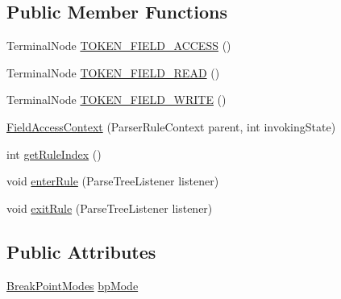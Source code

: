 \subsection*{Public Member Functions}
\begin{DoxyCompactItemize}
\item 
Terminal\+Node \hyperlink{classgov_1_1nasa_1_1jpf_1_1inspector_1_1server_1_1expression_1_1parser_1_1_expression_grammar_parser_1_1_field_access_context_a893899ca8553e97554dba780e0be300a}{T\+O\+K\+E\+N\+\_\+\+F\+I\+E\+L\+D\+\_\+\+A\+C\+C\+E\+SS} ()
\item 
Terminal\+Node \hyperlink{classgov_1_1nasa_1_1jpf_1_1inspector_1_1server_1_1expression_1_1parser_1_1_expression_grammar_parser_1_1_field_access_context_a76f3324c650be5cd44d0a88dac9f4f16}{T\+O\+K\+E\+N\+\_\+\+F\+I\+E\+L\+D\+\_\+\+R\+E\+AD} ()
\item 
Terminal\+Node \hyperlink{classgov_1_1nasa_1_1jpf_1_1inspector_1_1server_1_1expression_1_1parser_1_1_expression_grammar_parser_1_1_field_access_context_ae90dd41f87b8988729f7366e7037cb29}{T\+O\+K\+E\+N\+\_\+\+F\+I\+E\+L\+D\+\_\+\+W\+R\+I\+TE} ()
\item 
\hyperlink{classgov_1_1nasa_1_1jpf_1_1inspector_1_1server_1_1expression_1_1parser_1_1_expression_grammar_parser_1_1_field_access_context_ae83e73c197d5eaecb8ea51b8ab43248d}{Field\+Access\+Context} (Parser\+Rule\+Context parent, int invoking\+State)
\item 
int \hyperlink{classgov_1_1nasa_1_1jpf_1_1inspector_1_1server_1_1expression_1_1parser_1_1_expression_grammar_parser_1_1_field_access_context_ae107e745c9ac943be2c1bfb617a897b5}{get\+Rule\+Index} ()
\item 
void \hyperlink{classgov_1_1nasa_1_1jpf_1_1inspector_1_1server_1_1expression_1_1parser_1_1_expression_grammar_parser_1_1_field_access_context_a9b152ac1e839161b23bd4b2fc586faa5}{enter\+Rule} (Parse\+Tree\+Listener listener)
\item 
void \hyperlink{classgov_1_1nasa_1_1jpf_1_1inspector_1_1server_1_1expression_1_1parser_1_1_expression_grammar_parser_1_1_field_access_context_a1373cdab9ad8d980cfd26f64c76b769f}{exit\+Rule} (Parse\+Tree\+Listener listener)
\end{DoxyCompactItemize}
\subsection*{Public Attributes}
\begin{DoxyCompactItemize}
\item 
\hyperlink{enumgov_1_1nasa_1_1jpf_1_1inspector_1_1server_1_1breakpoints_1_1_break_point_modes}{Break\+Point\+Modes} \hyperlink{classgov_1_1nasa_1_1jpf_1_1inspector_1_1server_1_1expression_1_1parser_1_1_expression_grammar_parser_1_1_field_access_context_aae257159483b52a02404cc18b49b69b3}{bp\+Mode}
\end{DoxyCompactItemize}


